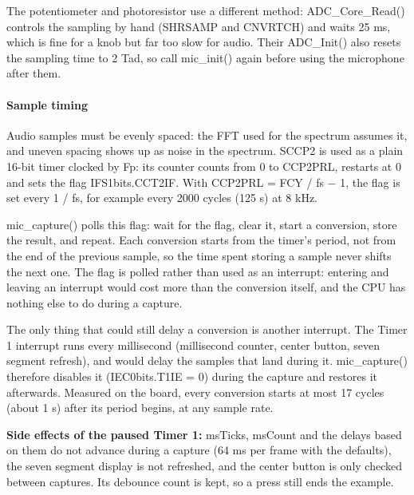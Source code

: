 \documentclass[
  11pt,
  letterpaper,
  oneside,
  DIV=13,               %
  parskip=half,          %
  headings=normal,
  chapterprefix=false,
  toc=listof,
  numbers=noenddot,
]{scrbook}
\begin{document}
The potentiometer and photoresistor use a different method: ADC\_Core\_Read() controls the sampling by hand (SHRSAMP and CNVRTCH) and waits 25 ms, which is fine for a knob but far too slow for audio. Their ADC\_Init() also resets the sampling time to 2 Tad, so call mic\_init() again before using the microphone after them.

\paragraph{Sample timing}

Audio samples must be evenly spaced: the FFT used for the spectrum assumes it, and uneven spacing shows up as noise in the spectrum. SCCP2 is used as a plain 16-bit timer clocked by Fp: its counter counts from 0 to CCP2PRL, restarts at 0 and sets the flag IFS1bits.CCT2IF. With CCP2PRL = FCY / fs $-$ 1, the flag is set every 1 / fs, for example every 2000 cycles (125 \textmu{}s) at 8 kHz.

mic\_capture() polls this flag: wait for the flag, clear it, start a conversion, store the result, and repeat. Each conversion starts from the timer's period, not from the end of the previous sample, so the time spent storing a sample never shifts the next one. The flag is polled rather than used as an interrupt: entering and leaving an interrupt would cost more than the conversion itself, and the CPU has nothing else to do during a capture.

The only thing that could still delay a conversion is another interrupt. The Timer 1 interrupt runs every millisecond (millisecond counter, center button, seven segment refresh), and would delay the samples that land during it. mic\_capture() therefore disables it (IEC0bits.T1IE = 0) during the capture and restores it afterwards. Measured on the board, every conversion starts at most 17 cycles (about 1 \textmu{}s) after its period begins, at any sample rate.

\textbf{Side effects of the paused Timer 1: }msTicks, msCount and the delays based on them do not advance during a capture (64 ms per frame with the defaults), the seven segment display is not refreshed, and the center button is only checked between captures. Its debounce count is kept, so a press still ends the example.
\end{document}
